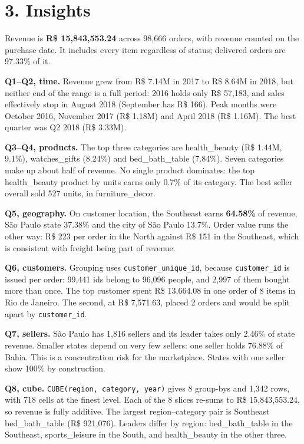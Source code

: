 \documentclass[10pt]{article}
\begin{document}
\section*{3. Insights}
Revenue is \textbf{R\$ 15,843,553.24} across 98,666 orders, with revenue counted on the purchase date. It includes every item regardless of status; delivered orders are 97.33\% of it.

\textbf{Q1--Q2, time.} Revenue grew from R\$ 7.14M in 2017 to R\$ 8.64M in 2018, but neither end of the range is a full period: 2016 holds only R\$ 57,183, and sales effectively stop in August 2018 (September has R\$ 166). Peak months were October 2016, November 2017 (R\$ 1.18M) and April 2018 (R\$ 1.16M). The best quarter was Q2 2018 (R\$ 3.33M).

\textbf{Q3--Q4, products.} The top three categories are health\_beauty (R\$ 1.44M, 9.1\%), watches\_gifts (8.24\%) and bed\_bath\_table (7.84\%). Seven categories make up about half of revenue. No single product dominates: the top health\_beauty product by units earns only 0.7\% of its category. The best seller overall sold 527 units, in furniture\_decor.

\textbf{Q5, geography.} On customer location, the Southeast earns \textbf{64.58\%} of revenue, São Paulo state 37.38\% and the city of São Paulo 13.7\%. Order value runs the other way: R\$ 223 per order in the North against R\$ 151 in the Southeast, which is consistent with freight being part of revenue.

\textbf{Q6, customers.} Grouping uses \texttt{customer\_unique\_id}, because \texttt{customer\_id} is issued per order: 99,441 ids belong to 96,096 people, and 2,997 of them bought more than once. The top customer spent R\$ 13,664.08 in one order of 8 items in Rio de Janeiro. The second, at R\$ 7,571.63, placed 2 orders and would be split apart by \texttt{customer\_id}.

\textbf{Q7, sellers.} São Paulo has 1,816 sellers and its leader takes only 2.46\% of state revenue. Smaller states depend on very few sellers: one seller holds 76.88\% of Bahia. This is a concentration risk for the marketplace. States with one seller show 100\% by construction.

\textbf{Q8, cube.} \texttt{CUBE(region, category, year)} gives 8 group-bys and 1,342 rows, with 718 cells at the finest level. Each of the 8 slices re-sums to R\$ 15,843,553.24, so revenue is fully additive. The largest region--category pair is Southeast bed\_bath\_table (R\$ 921,076). Leaders differ by region: bed\_bath\_table in the Southeast, sports\_leisure in the South, and health\_beauty in the other three.
\end{document}
